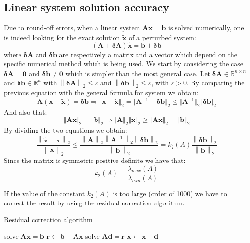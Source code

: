 \documentclass[12pt, a4paper]{report}
\newtheorem[style=M,bodystyle=\normalfont]{theorem}{Theorem}
\newtheorem[style=M,bodystyle=\normalfont]{proposition}{Proposition}
\newtheorem[style=M,bodystyle=\normalfont]{corollary}{Corollary}
\newtheorem[style=M,bodystyle=\normalfont]{lemma}{Lemma}
\newtheorem[style=M,bodystyle=\normalfont]{definition}{Definition}
\begin{document}
    \subsection{Linear system solution accuracy}
    Due to round-off errors, when a linear system $\boldsymbol{Ax}=\boldsymbol{b}$ is solved numerically, one is indeed looking for the 
    exact solution $\widetilde{\boldsymbol{x}}$ of a perturbed system: 
    \[\left( \boldsymbol{A} + \boldsymbol{\delta A}\right)\widetilde{\boldsymbol{x}}=\boldsymbol{b}+\boldsymbol{\delta b}\]
    where $\boldsymbol{\delta A}$ and $\boldsymbol{\delta b}$ are respectively a matrix and a vector which depend on the specific 
    numerical method which is being used. We start by considering the case $\boldsymbol{\delta A}=\boldsymbol{0}$ and $\boldsymbol{\delta b}\neq\boldsymbol{0}$ which is 
    simpler than the most general case. Let $\boldsymbol{\delta A} \in \mathbb{R}^{n \times n}$ and $\boldsymbol{\delta b} \in \mathbb{R}^{n}$ with $\left\lVert \boldsymbol{\delta A} \right\rVert_2 \leq \varepsilon$ 
    and $\left\lVert \boldsymbol{\delta b} \right\rVert_2 \leq \varepsilon$, with $\varepsilon > 0$. By comparing the previous equation with the general formula for system we obtain: 
    \[\boldsymbol{A}\left(\boldsymbol{x}-\widetilde{\boldsymbol{x}}\right)=\boldsymbol{\delta b}\Rightarrow\Vert \boldsymbol{x}-\widetilde{\boldsymbol{x}} \Vert_2=\Vert \boldsymbol{A}^{-1}-\boldsymbol{\delta b} \Vert_2 \leq \Vert \boldsymbol{A}^{-1} \Vert_2 \Vert \boldsymbol{\delta b} \Vert_2\]
    And also that: 
    \[\Vert\boldsymbol{Ax}\Vert_2=\Vert\boldsymbol{b}\Vert_2 \Rightarrow \Vert\boldsymbol{A}\Vert_2\Vert\boldsymbol{x}\Vert_2 \geq \Vert\boldsymbol{Ax}\Vert_2=\Vert\boldsymbol{b}\Vert_2\]
    By dividing the two equations we obtain: 
    \[\dfrac{\left\lVert \widetilde{\boldsymbol{x}}-\boldsymbol{x} \right\rVert_2}{\left\lVert \boldsymbol{x} \right\rVert_2} \leq \dfrac{\left\lVert \boldsymbol{A} \right\rVert_2\left\lVert \boldsymbol{A}^{-1} \right\rVert_2\left\lVert \boldsymbol{\delta b} \right\rVert_2}{\left\lVert \boldsymbol{b} \right\rVert_2}=k_2(A)\dfrac{\left\lVert \boldsymbol{\delta b} \right\rVert_2}{\left\lVert \boldsymbol{b} \right\rVert_2}\]
    Since the matrix is symmetric positive definite we have that: 
    \[k_2(A)=\dfrac{\lambda_{max}(A)}{\lambda_{min}(A)}\]

    If the value of the constant $k_2(A)$ is too large (order of 1000) we have to correct the result by using the residual correction algorithm. 
    \begin{algorithm}[H]
        \caption{Residual correction algorithm}
            \begin{algorithmic}[1]
                \State solve $\boldsymbol{Ax}=\boldsymbol{b}$
                \State $\boldsymbol{r} \leftarrow \boldsymbol{b}-\boldsymbol{Ax}$
                \State solve $\boldsymbol{Ad}=\boldsymbol{r}$
                \State $\boldsymbol{x} \leftarrow \boldsymbol{x}+\boldsymbol{d}$
            \end{algorithmic}
    \end{algorithm}
\end{document}
